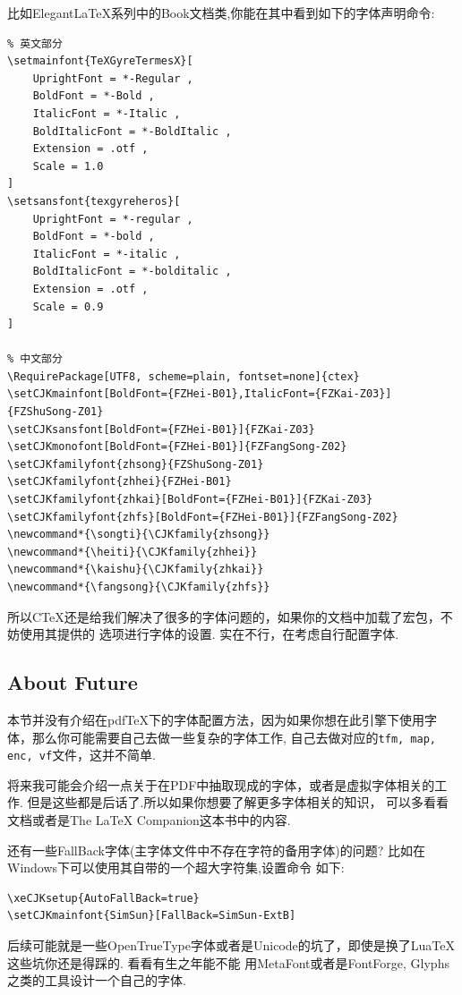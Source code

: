 比如Elegant\LaTeX{}系列中的Book文档类,你能在其中看到如下的字体声明命令:
\begin{verbatim}
% 英文部分
\setmainfont{TeXGyreTermesX}[
    UprightFont = *-Regular ,
    BoldFont = *-Bold ,
    ItalicFont = *-Italic ,
    BoldItalicFont = *-BoldItalic ,
    Extension = .otf ,
    Scale = 1.0
]
\setsansfont{texgyreheros}[
    UprightFont = *-regular ,
    BoldFont = *-bold ,
    ItalicFont = *-italic ,
    BoldItalicFont = *-bolditalic ,
    Extension = .otf ,
    Scale = 0.9
]

% 中文部分
\RequirePackage[UTF8, scheme=plain, fontset=none]{ctex}
\setCJKmainfont[BoldFont={FZHei-B01},ItalicFont={FZKai-Z03}]{FZShuSong-Z01}
\setCJKsansfont[BoldFont={FZHei-B01}]{FZKai-Z03}
\setCJKmonofont[BoldFont={FZHei-B01}]{FZFangSong-Z02}
\setCJKfamilyfont{zhsong}{FZShuSong-Z01}
\setCJKfamilyfont{zhhei}{FZHei-B01}
\setCJKfamilyfont{zhkai}[BoldFont={FZHei-B01}]{FZKai-Z03}
\setCJKfamilyfont{zhfs}[BoldFont={FZHei-B01}]{FZFangSong-Z02}
\newcommand*{\songti}{\CJKfamily{zhsong}}
\newcommand*{\heiti}{\CJKfamily{zhhei}}
\newcommand*{\kaishu}{\CJKfamily{zhkai}}
\newcommand*{\fangsong}{\CJKfamily{zhfs}}
\end{verbatim}

所以C\TeX{}还是给我们解决了很多的字体问题的，如果你的文档中加载了宏包，不妨使用其提供的
选项进行字体的设置. 实在不行，在考虑自行配置字体.

\subsection{About Future}
本节并没有介绍在pdf\TeX{}下的字体配置方法，因为如果你想在此引擎下使用字体，那么你可能需要自己去做一些复杂的字体工作,
自己去做对应的\texttt{tfm, map, enc, vf}文件，这并不简单. 

将来我可能会介绍一点关于在PDF中抽取现成的字体，或者是虚拟字体相关的工作. 但是这些都是后话了.所以如果你想要了解更多字体相关的知识，
可以多看看文档或者是{The \LaTeX{} Companion}这本书中的内容.

还有一些FallBack字体(主字体文件中不存在字符的备用字体)的问题? 比如在Windows下可以使用其自带的一个超大字符集,设置命令
如下:
\begin{verbatim}
\xeCJKsetup{AutoFallBack=true}
\setCJKmainfont{SimSun}[FallBack=SimSun-ExtB]
\end{verbatim}

后续可能就是一些OpenTrueType字体或者是Unicode的坑了，即使是换了Lua\TeX{}这些坑你还是得踩的. 看看有生之年能不能
用MetaFont或者是FontForge, Glyphs之类的工具设计一个自己的字体.

